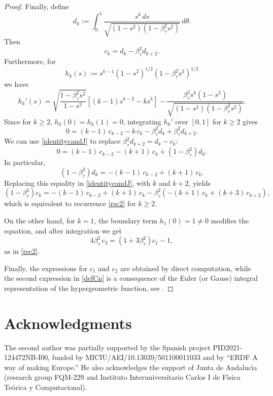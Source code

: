 \documentclass[reqno,11pt]{amsart}
\theoremstyle{plain}
\theoremstyle{definition}
\theoremstyle{remark}
\numberwithin{equation}{section}
\begin{document}
\begin{proof}
Finally, define
$$
d_k:=\int_0^1 \frac{s^k \, ds}{\sqrt{(1-s^2)(1-\beta_\tau^2 s^2)}} \,d \theta.
$$ 
Then
\begin{equation}
    \label{identitycandJ}
c_k=d_k-\beta_\tau^2 d_{k+2} .
\end{equation}
Furthermore, for 
$$
h_k(s):= s^{k-1} (1-s^2)^{1/2}(1-\beta_\tau^2s^2)^{1/2}
$$ 
we have
$$
h_k'(s)= \sqrt{\frac{1-\beta_\tau^2 s^2}{1-s^2}}  \left[(k-1) s^{k-2} -k s^k \right] -\frac{\beta_\tau^2 s^{k}(1-s^2)}{\sqrt{(1-s^2)(1-\beta_\tau^2 s^2)}} .
$$
Since for $k \geq 2$, $h_k(0)= h_k(1)=0$, integrating $h_k'$ over $[0, 1]$ for $k\geq2$ gives
\begin{equation*}
0=(k-1) \, c_{k-2}-k \, c_k-\beta_\tau^2 d_k+\beta_\tau^2 d_{k+2} .
\end{equation*}
We can use \eqref{identitycandJ} to replace $\beta_\tau^2 d_{k+2}=d_k-c_k$:
$$
0=(k-1) \, c_{k-2}-(k+1) \, c_k+(1-\beta_\tau^2) d_k  .
$$
In particular, 
$$
(1-\beta_\tau^2) d_k=-(k-1) \, c_{k-2}+(k+1) \, c_k.
$$
Replacing this equality in \eqref{identitycandJ}, with $k$ and $k+2$, yields
$$
(1-\beta_\tau^2) c_k=-(k-1) \, c_{k-2}+(k+1) \, c_k-\beta_\tau^2 \left(-(k+1) \, c_{k}+(k+3) \, c_{k+2}\right) ,
$$
which is equivalent to recurrence \eqref{rec2} for $k\ge 2$.

On the other hand, for $k=1$, the boundary term $h_1(0)=1 \neq 0$ modifies the equation, and after integration we get
$$
4 \beta_\tau^2\, c_3=\left(1+3 \beta_\tau^2\right) c_1-1 ,
$$
as in \eqref{rec2}. 

Finally, the expressions for $c_1$ and $c_2$ are obtained by direct computation, while the second expression in \eqref{defCn} is a consequence of the Euler (or Gauss) integral representation of the hypergeometric function, see \cite[formula (15.6.1)]{DLMF}.
\end{proof}

\section*{Acknowledgments}

    The second author was partially supported by the Spanish project PID2021-124472NB-I00, funded by MICIU/AEI/10.13039/501100011033 and by ``ERDF A way of making Europe.'' He also acknowledges the support of Junta de Andaluc\'{\i}a (research group FQM-229 and Instituto Interuniversitario Carlos I de F\'{\i}sica Te\'orica y Computacional). 
\end{document}
